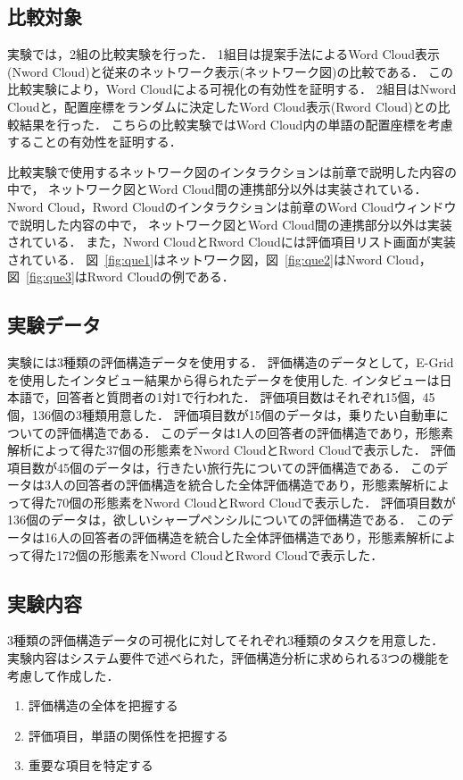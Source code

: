 \documentclass[syuuron]{kuee}
\begin{document}
		\subsection{比較対象}
			実験では，2組の比較実験を行った．
			1組目は提案手法によるWord Cloud表示(Nword Cloud)と従来のネットワーク表示(ネットワーク図)の比較である．
			この比較実験により，Word Cloudによる可視化の有効性を証明する．
			2組目はNword Cloudと，配置座標をランダムに決定したWord Cloud表示(Rword Cloud)との比較結果を行った．
			こちらの比較実験ではWord Cloud内の単語の配置座標を考慮することの有効性を証明する．
			
			比較実験で使用するネットワーク図のインタラクションは前章で説明した内容の中で，
			ネットワーク図とWord Cloud間の連携部分以外は実装されている．
			Nword Cloud，Rword Cloudのインタラクションは前章のWord Cloudウィンドウで説明した内容の中で，
			ネットワーク図とWord Cloud間の連携部分以外は実装されている．
			また，Nword CloudとRword Cloudには評価項目リスト画面が実装されている．
			図~\ref{fig:que1}はネットワーク図，図~\ref{fig:que2}はNword Cloud，
			図~\ref{fig:que3}はRword Cloudの例である．
			
		\subsection{実験データ}
			実験には3種類の評価構造データを使用する．
			評価構造のデータとして，E-Gridを使用したインタビュー結果から得られたデータを使用した.
			インタビューは日本語で，回答者と質問者の1対1で行われた．
			評価項目数はそれぞれ15個，45個，136個の3種類用意した．
			評価項目数が15個のデータは，乗りたい自動車についての評価構造である．
			このデータは1人の回答者の評価構造であり，形態素解析によって得た37個の形態素をNword CloudとRword Cloudで表示した．
			評価項目数が45個のデータは，行きたい旅行先についての評価構造である．
			このデータは3人の回答者の評価構造を統合した全体評価構造であり，形態素解析によって得た70個の形態素をNword CloudとRword Cloudで表示した．
			評価項目数が136個のデータは，欲しいシャープペンシルについての評価構造である．
			このデータは16人の回答者の評価構造を統合した全体評価構造であり，形態素解析によって得た172個の形態素をNword CloudとRword Cloudで表示した．
		
		\subsection{実験内容}
			3種類の評価構造データの可視化に対してそれぞれ3種類のタスクを用意した．
			実験内容はシステム要件で述べられた，評価構造分析に求められる3つの機能を考慮して作成した．
			\begin{enumerate}
				\item 評価構造の全体を把握する
				\item 評価項目，単語の関係性を把握する
				\item 重要な項目を特定する
			\end{enumerate}
\end{document}
